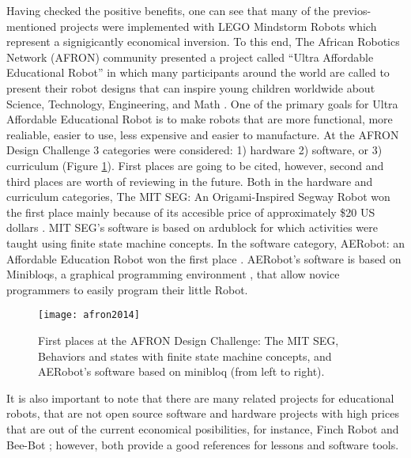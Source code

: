 Having checked the positive benefits, one can see that many of the previos-mentioned 
projects were implemented with LEGO Mindstorm Robots which represent a signigicantly 
economical inversion. To this end, The African Robotics Network (AFRON) 
community presented a project called ``Ultra Affordable Educational Robot'' in 
which many participants around the world are called to present their robot designs 
that can inspire young children worldwide about Science, Technology, Engineering, 
and Math \cite{AFRON2014}. One of the primary goals for Ultra Affordable Educational 
Robot is to make robots that are more functional, more realiable, easier to use, less 
expensive and easier to manufacture. At the AFRON Design Challenge 3 categories were
considered: 
1) hardware 2) software, or 3) curriculum (Figure \ref{fig:afron2014}). First places 
are going to be cited, however, second and third places are worth of reviewing in the 
future. Both in the hardware and curriculum categories, The MIT SEG: An Origami-Inspired 
Segway Robot won the first place mainly because of  its accesible price of 
approximately \$20 US dollars 
\cite{MITPrintableRobot2013}. MIT SEG's software is based on ardublock
\cite{Ardublock2013}  for which activities were taught using finite state machine 
concepts. In the software category, AERobot: an Affordable Education Robot won the first 
place \cite{AERobot2013}. AERobot's software is based on Minibloqs, a graphical 
programming environment \cite{minibloq2011}, that allow novice programmers to easily 
program their little Robot.
\begin{figure}[htbp!] 
\centering    
\texttt{[image: afron2014]}
\caption[PA]{First places at the AFRON Design Challenge: The MIT SEG, Behaviors and 
states with finite state machine concepts, and  AERobot's software based on minibloq
(from left to right).}
\label{fig:afron2014}
\end{figure}

It is also important to note that there are many related projects for educational robots, 
that are not open source software and hardware projects with high prices that are out 
of the current economical posibilities, for instance, Finch Robot \cite{finchrobot2014} 
and Bee-Bot \cite{bee-bot2014}; however, both provide a good references for lessons 
and software tools.
